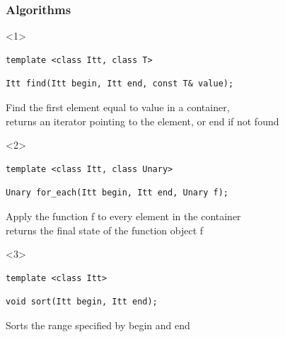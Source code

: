 \documentclass[14pt,a4paper,dvipsnames,usenames]{beamer}
\begin{document}
\begin{frame}[fragile]
  \frametitle{Algorithms}

  \begin{overlayarea}{\textwidth}{5cm}
  \begin{onlyenv}<1>
  \begin{lstlisting}[]
template <class Itt, class T>
  \end{lstlisting}\vspace*{-1ex}
  \begin{lstlisting}[morekeywords={Itt,T}]
Itt find(Itt begin, Itt end, const T& value);
  \end{lstlisting}

  \vspace{1em}
  Find the first element equal to {\color{Tropiteal}value} in a container,\\
  returns an iterator pointing to the element, or {\color{Tropiteal}end} if not found
  \end{onlyenv}

  \begin{onlyenv}<2>
  \begin{lstlisting}[]
template <class Itt, class Unary>
  \end{lstlisting}\vspace*{-1ex}
  \begin{lstlisting}[morekeywords={Itt,Unary}]
Unary for_each(Itt begin, Itt end, Unary f);
  \end{lstlisting}

  \vspace{1em}
  Apply the function {\color{Tropiteal}f} to every element in the container\\
  returns the final state of the function object {\color{Tropiteal}f}
  \end{onlyenv}

  \begin{onlyenv}<3>
  \begin{lstlisting}[]
template <class Itt>
  \end{lstlisting}\vspace*{-1ex}
  \begin{lstlisting}[morekeywords={Itt}]
void sort(Itt begin, Itt end);
  \end{lstlisting}

  \vspace{1em}
  Sorts the range specified by {\color{Tropiteal}begin} and {\color{Tropiteal}end}
  \end{onlyenv}


\end{overlayarea}
\end{frame}
\end{document}

